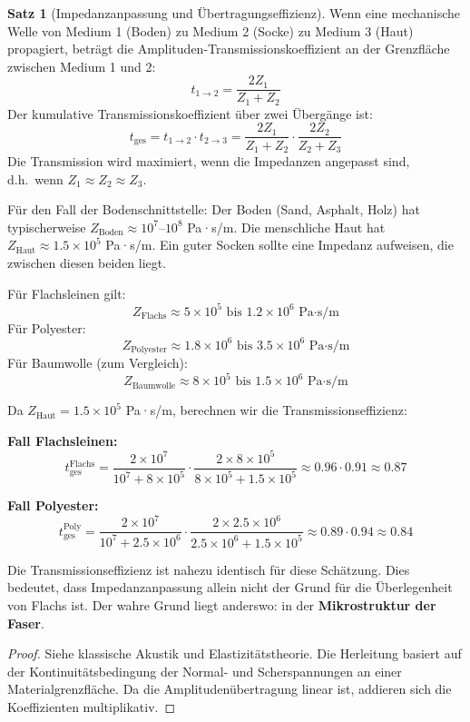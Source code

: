 \documentclass[a4paper,12pt]{article}
\theoremstyle{definition}
\newtheorem{satz}{Satz}
\begin{document}
\begin{satz}[Impedanzanpassung und Übertragungseffizienz]
Wenn eine mechanische Welle von Medium 1 (Boden) zu Medium 2 (Socke) zu Medium 3 (Haut) propagiert, beträgt die Amplituden-Transmissionskoeffizient an der Grenzfläche zwischen Medium 1 und 2:
\[
t_{1 \to 2} = \frac{2Z_1}{Z_1 + Z_2}
\]
Der kumulative Transmissionskoeffizient über zwei Übergänge ist:
\[
t_{\text{ges}} = t_{1 \to 2} \cdot t_{2 \to 3} = \frac{2Z_1}{Z_1 + Z_2} \cdot \frac{2Z_2}{Z_2 + Z_3}
\]
Die Transmission wird maximiert, wenn die Impedanzen angepasst sind, d.h.\ wenn $Z_1 \approx Z_2 \approx Z_3$. 

Für den Fall der Bodenschnittstelle: Der Boden (Sand, Asphalt, Holz) hat typischerweise $Z_{\text{Boden}} \approx 10^7$--$10^8$ Pa·s/m. Die menschliche Haut hat $Z_{\text{Haut}} \approx 1.5 \times 10^5$ Pa·s/m. Ein guter Socken sollte eine Impedanz aufweisen, die zwischen diesen beiden liegt.

Für Flachsleinen gilt:
\[
Z_{\text{Flachs}} \approx 5 \times 10^5 \text{ bis } 1.2 \times 10^6 \text{ Pa·s/m}
\]
Für Polyester:
\[
Z_{\text{Polyester}} \approx 1.8 \times 10^6 \text{ bis } 3.5 \times 10^6 \text{ Pa·s/m}
\]
Für Baumwolle (zum Vergleich):
\[
Z_{\text{Baumwolle}} \approx 8 \times 10^5 \text{ bis } 1.5 \times 10^6 \text{ Pa·s/m}
\]

Da $Z_{\text{Haut}} = 1.5 \times 10^5$ Pa·s/m, berechnen wir die Transmissionseffizienz:

\textbf{Fall Flachsleinen:}
\[
t_{\text{ges}}^{\text{Flachs}} = \frac{2 \times 10^7}{10^7 + 8 \times 10^5} \cdot \frac{2 \times 8 \times 10^5}{8 \times 10^5 + 1.5 \times 10^5}
\approx 0.96 \cdot 0.91 \approx 0.87
\]

\textbf{Fall Polyester:}
\[
t_{\text{ges}}^{\text{Poly}} = \frac{2 \times 10^7}{10^7 + 2.5 \times 10^6} \cdot \frac{2 \times 2.5 \times 10^6}{2.5 \times 10^6 + 1.5 \times 10^5}
\approx 0.89 \cdot 0.94 \approx 0.84
\]

Die Transmissionseffizienz ist nahezu identisch für diese Schätzung. Dies bedeutet, dass Impedanzanpassung allein nicht der Grund für die Überlegenheit von Flachs ist. Der wahre Grund liegt anderswo: in der \textbf{Mikrostruktur der Faser}.
\end{satz}

\begin{proof}
Siehe klassische Akustik und Elastizitätstheorie. Die Herleitung basiert auf der Kontinuitätsbedingung der Normal- und Scherspannungen an einer Materialgrenzfläche. Da die Amplitudenübertragung linear ist, addieren sich die Koeffizienten multiplikativ.
\end{proof}
\end{document}
